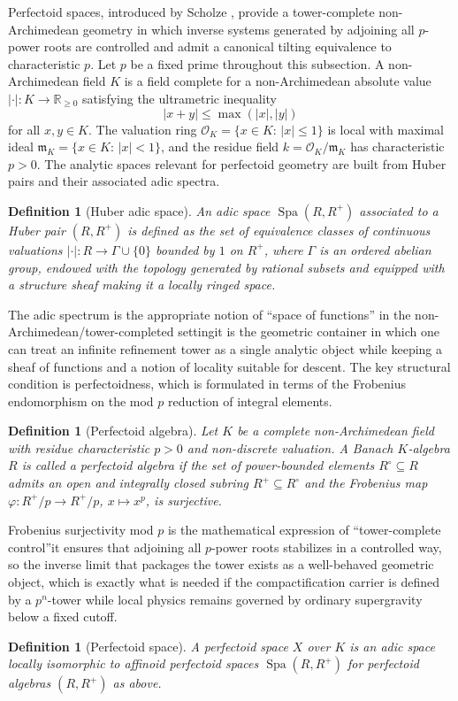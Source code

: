 \documentclass[11pt]{article}
\newtheorem{definition}[theorem]{Definition}
\theoremstyle{remark}
\newcommand{\R}{\mathbb{R}}
\newcommand{\calO}{\mathcal{O}}
\DeclareMathOperator{\Spa}{Spa}
\begin{document}
Perfectoid spaces, introduced by Scholze \cite{Scholze2012}, provide a tower-complete non-Archimedean geometry in which inverse systems generated by adjoining all \(p\)-power roots are controlled and admit a canonical tilting equivalence to characteristic \(p\). Let \(p\) be a fixed prime throughout this subsection. A non-Archimedean field \(K\) is a field complete for a non-Archimedean absolute value \(|\cdot|:K\to \R_{\ge 0}\) satisfying the ultrametric inequality
\begin{equation}\label{7}
|x+y|\le \max(|x|,|y|)
\end{equation}
for all \(x,y\in K\). The valuation ring \(\calO_K=\{x\in K:\,|x|\le 1\}\) is local with maximal ideal \(\mathfrak m_K=\{x\in K:\,|x|<1\}\), and the residue field \(k=\calO_K/\mathfrak m_K\) has characteristic \(p>0\). The analytic spaces relevant for perfectoid geometry are built from Huber pairs and their associated adic spectra. \begin{definition}[Huber adic space]An adic space \(\Spa(R,R^+)\) associated to a Huber pair \((R,R^+)\) is defined as the set of equivalence classes of continuous valuations \(|\cdot|:R\to \Gamma\cup\{0\}\) bounded by \(1\) on \(R^+\), where \(\Gamma\) is an ordered abelian group, endowed with the topology generated by rational subsets and equipped with a structure sheaf making it a locally ringed space.\end{definition}
 The adic spectrum is the appropriate notion of ``space of functions'' in the non-Archimedean/tower-completed setting\:it is the geometric container in which one can treat an infinite refinement tower as a single analytic object while keeping a sheaf of functions and a notion of locality suitable for descent. The key structural condition is perfectoidness, which is formulated in terms of the Frobenius endomorphism on the mod \(p\) reduction of integral elements. \begin{definition}[Perfectoid algebra]\label{def:perfalg}Let \(K\) be a complete non-Archimedean field with residue characteristic \(p>0\) and non-discrete valuation. A Banach \(K\)-algebra \(R\) is called a perfectoid algebra if the set of power-bounded elements \(R^\circ\subseteq R\) admits an open and integrally closed subring \(R^+\subseteq R^\circ\) and the Frobenius map \(\varphi:R^+/p\to R^+/p\), \(x\mapsto x^p\), is surjective.\end{definition}
 Frobenius surjectivity mod \(p\) is the mathematical expression of ``tower-complete control''\:it ensures that adjoining all \(p\)-power roots stabilizes in a controlled way, so the inverse limit that packages the tower exists as a well-behaved geometric object, which is exactly what is needed if the compactification carrier is defined by a \(p^n\)-tower while local physics remains governed by ordinary supergravity below a fixed cutoff. \begin{definition}[Perfectoid space]A perfectoid space \(X\) over \(K\) is an adic space locally isomorphic to affinoid perfectoid spaces \(\Spa(R,R^+)\) for perfectoid algebras \((R,R^+)\) as above.\end{definition}
\end{document}
